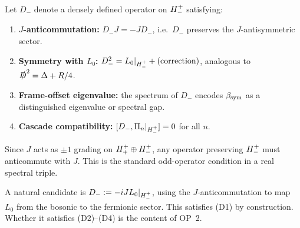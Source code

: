 \begin{definition}
\label{def:dirac-op-Hplusminus}
Let $D_{-}$ denote a densely defined operator on $H^+_-$ satisfying:
\begin{enumerate}[label=(D\arabic*)]
  \item \textbf{$J$-anticommutation:} $D_{-}J=-JD_{-}$, i.e.\ $D_{-}$
    preserves the $J$-antisymmetric sector.
  \item \textbf{Symmetry with $L_0$:} $D_{-}^2 =
    L_0|_{H^+_-} + (\text{correction})$, analogous to
    $\slashed{D}^2 = \Delta + R/4$.
  \item \textbf{Frame-offset eigenvalue:} the spectrum of $D_{-}$
    encodes $\beta_{\mathrm{sym}}$ as a distinguished eigenvalue or spectral gap.
  \item \textbf{Cascade compatibility:}
    $[D_{-},\Pi_n|_{H^+_-}]=0$ for all $n$.
\end{enumerate}
\end{definition}

\begin{remark}
Since $J$ acts as $\pm 1$ grading on $H^+_+\oplus H^+_-$,
any operator preserving $H^+_-$ must anticommute with $J$.
This is the standard odd-operator condition in a real spectral triple.
\end{remark}

\begin{remark}
A natural candidate is $D_{-}:=-iJ L_0|_{H^+_-}$, using the
$J$-anticommutation to map $L_0$ from the bosonic to the fermionic
sector. This satisfies (D1) by construction. Whether it satisfies
(D2)--(D4) is the content of OP~2.
\end{remark}

